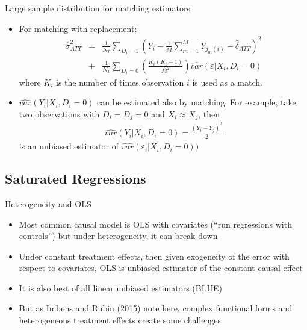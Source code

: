 \documentclass{beamer}
\begin{document}
\begin{frame}{Large sample distribution for matching estimators}
	
	\begin{itemize}
	\item For matching with replacement:
		\begin{eqnarray*}
		\widehat{\sigma}^2_{ATT} &=& \frac{1}{N_T} \sum_{D_i=1} \left( Y_i - \frac{1}{M} \sum_{m=1}^M Y_{j_m(i)} - \widehat{\delta}_{ATT} \right)^2 \\
		&+& \frac{1}{N_T} \sum_{D_i=0} \left( \frac{K_i(K_i-1)}{M^2} \right) \widehat{var}(\varepsilon | X_i,D_i=0)
		\end{eqnarray*}where $K_i$ is the number of times observation $i$ is used as a match.
	\item $\widehat{var}(Y_i | X_i,D_i=0)$ can be estimated also by matching.  For example, take two observations with $D_i=D_j=0$ and $X_i \approx X_j$, then
		\begin{eqnarray*}
		\widehat{var}(Y_i | X_i,D_i=0) = \frac{(Y_i-Y_j)^2}{2}
		\end{eqnarray*}is an unbiased estimator of $\widehat{var}(\varepsilon_i | X_i,D_i=0))$
	\end{itemize}
\end{frame}

\subsection{Saturated Regressions}
	

\begin{frame}{Heterogeneity and OLS}

\begin{itemize}
\item Most common causal model is OLS with covariates (``run regressions with controls'') but under heterogeneity, it can break down
\item Under constant treatment effects, then given exogeneity of the error with respect to covariates, OLS is unbiased estimator of the constant causal effect
\item It is also best of all linear unbiased estimators (BLUE)
\item But as Imbens and Rubin (2015) note here, complex functional forms and heterogeneous treatment effects create some challenges
\end{itemize}

\end{frame}
\end{document}
